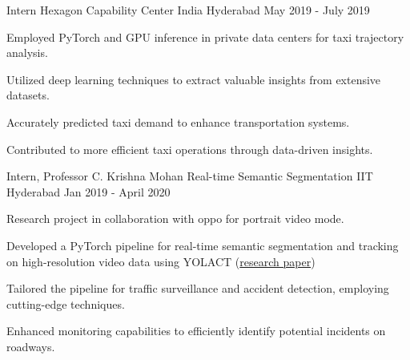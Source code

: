 \begin{cventries}
\cventry
    {Intern} %
    {Hexagon Capability Center India} %
    {Hyderabad} %
    {May 2019 - July 2019} %
    {
    \begin{cvitems}
        \item Employed PyTorch and GPU inference in private data centers for taxi trajectory analysis.
        \item Utilized deep learning techniques to extract valuable insights from extensive datasets.
        \item Accurately predicted taxi demand to enhance transportation systems.
        \item Contributed to more efficient taxi operations through data-driven insights.
    \end{cvitems}
    }

\cventry
    {Intern, Professor C. Krishna Mohan} %
    {Real-time Semantic Segmentation} %
    {IIT Hyderabad} %
    {Jan 2019 - April 2020} %
    {
    \begin{cvitems}
        \item Research project in collaboration with oppo for portrait video mode.
        \item Developed a PyTorch pipeline for real-time semantic segmentation and tracking on high-resolution video data using YOLACT (\textcolor{linkBlue}{\href{https://arxiv.org/abs/1904.02689}{research paper}})
        \item Tailored the pipeline for traffic surveillance and accident detection, employing cutting-edge techniques.
        \item Enhanced monitoring capabilities to efficiently identify potential incidents on roadways.
    \end{cvitems}
    }

\end{cventries}
